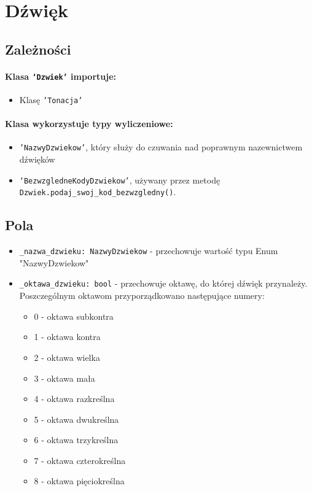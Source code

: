 \documentclass[dokumentacja.tex]{subfiles}
\begin{document}
\section{Dźwięk}

\subsection{Zależności}
\paragraph*{Klasa \texttt{`Dzwiek'} importuje:}
\begin{itemize}
    \item Klasę \texttt{'Tonacja'}
\end{itemize}
\paragraph*{Klasa wykorzystuje typy wyliczeniowe:}
\begin{itemize}
    \item \texttt{'NazwyDzwiekow'}, który służy do czuwania nad poprawnym nazewnictwem dźwięków
    \item \texttt{`BezwzgledneKodyDzwiekow'}, używany przez metodę \texttt{Dzwiek.podaj\_swoj\_kod\_bezwzgledny()}.
\end{itemize}

\subsection{Pola}
\begin{itemize}
    \item \texttt{\_nazwa\_dzwieku: NazwyDzwiekow} - przechowuje wartość typu Enum "NazwyDzwiekow"
    \item \texttt{\_oktawa\_dzwieku: bool} - przechowuje oktawę, do której dźwięk przynależy. Poszczególnym oktawom przyporządkowano następujące numery:
    \begin{itemize}[label = o]
        \item 0 - oktawa subkontra
        \item 1 - oktawa kontra
        \item 2 - oktawa wielka
        \item 3 - oktawa mała 
        \item 4 - oktawa razkreślna
        \item 5 - oktawa dwukreślna
        \item 6 - oktawa trzykreślna
        \item 7 - oktawa czterokreślna
        \item 8 - oktawa pięciokreślna
    \end{itemize}
\end{itemize}
\end{document}
